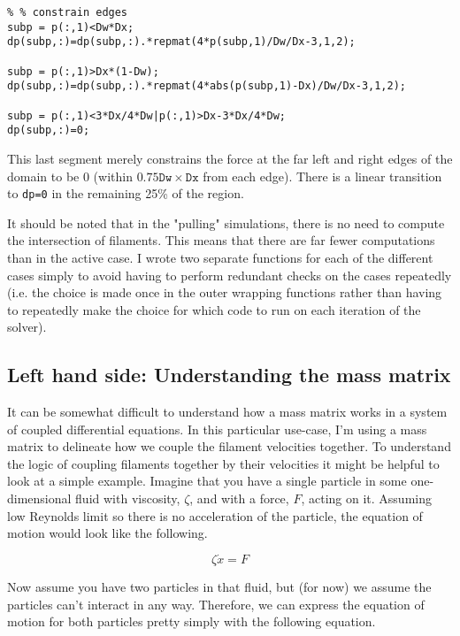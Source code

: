 \begin{verbatim}
% % constrain edges
subp = p(:,1)<Dw*Dx;
dp(subp,:)=dp(subp,:).*repmat(4*p(subp,1)/Dw/Dx-3,1,2);

subp = p(:,1)>Dx*(1-Dw);
dp(subp,:)=dp(subp,:).*repmat(4*abs(p(subp,1)-Dx)/Dw/Dx-3,1,2);

subp = p(:,1)<3*Dx/4*Dw|p(:,1)>Dx-3*Dx/4*Dw;
dp(subp,:)=0;
\end{verbatim}

This last segment merely constrains the force at the far left and right edges of the domain to be 0 (within $0.75 \texttt{Dw}\times\texttt{Dx}$ from each edge).  There is a linear transition to \texttt{dp=0} in the remaining 25\% of the region.

It should be noted that in the "pulling" simulations, there is no need to compute the intersection of filaments.  This means that there are far fewer computations than in the active case.   I wrote two separate functions for each of the different cases simply to avoid having to perform redundant checks on the cases repeatedly (i.e. the choice is made once in the outer wrapping functions rather than having to repeatedly make the choice for which code to run on each iteration of the solver).

\subsection{Left hand side: Understanding the mass matrix}

It can be somewhat difficult to understand how a mass matrix works in a system of coupled differential equations.  In this particular use-case, I'm using a mass matrix to delineate how we couple the filament velocities together.  To understand the logic of coupling filaments together by their velocities it might be helpful to look at a simple example.  Imagine that you have a single particle in some one-dimensional fluid with viscosity, $\zeta$, and with a force, $F$, acting on it.  Assuming low Reynolds limit so there is no acceleration of the particle, the equation of motion would look like the following.

\begin{equation}
\zeta\dot{x}=F
\end{equation}

Now assume you have two particles in that fluid, but (for now) we assume the particles can't interact in any way.  Therefore, we can express the equation of motion for both particles pretty simply with the following equation.

